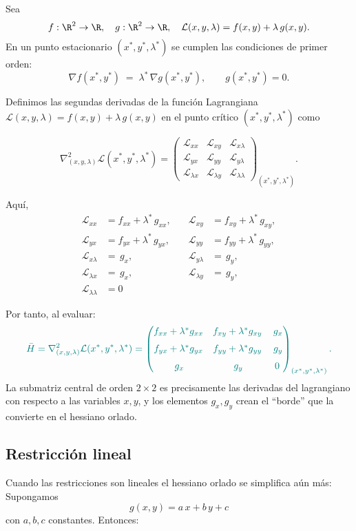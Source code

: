 \documentclass{article}
\begin{document}
Sea
\[
f:\R^2\to\R,
\quad
g:\R^2\to\R,
\quad
\mathcal L(x,y,\lambda)=f(x,y)+\lambda\,g(x,y).
\]
En un punto estacionario $(x^*,y^*,\lambda^*)$ se cumplen las condiciones de primer orden:
\[
\nabla f(x^*,y^*) \;=\;\lambda^*\,\nabla g(x^*,y^*),
\qquad
g(x^*,y^*)=0.
\]


Definimos las segundas derivadas de la función Lagrangiana
\(\mathcal L(x,y,\lambda)=f(x,y)+\lambda\,g(x,y)\) en el punto crítico \((x^*,y^*,\lambda^*)\) como

\[
\nabla^2_{(x,y,\lambda)}\mathcal L(x^*,y^*,\lambda^*)
=
\begin{pmatrix}
\mathcal L_{xx} & \mathcal L_{xy} & \mathcal L_{x\lambda} \\[6pt]
\mathcal L_{yx} & \mathcal L_{yy} & \mathcal L_{y\lambda} \\[6pt]
\mathcal L_{\lambda x} & \mathcal L_{\lambda y} & \mathcal L_{\lambda\lambda}
\end{pmatrix}_{(x^*,y^*,\lambda^*)}.
\]

Aquí,
\[
\begin{aligned}
\mathcal L_{xx}&=f_{xx}+\lambda^*\,g_{xx}, 
&\quad
\mathcal L_{xy}&=f_{xy}+\lambda^*\,g_{xy},\\
\mathcal L_{yx}&=f_{yx}+\lambda^*\,g_{yx}, 
&\quad
\mathcal L_{yy}&=f_{yy}+\lambda^*\,g_{yy},\\[4pt]
\mathcal L_{x\lambda}&=\,g_x,
&\quad
\mathcal L_{y\lambda}&=\,g_y,\\
\mathcal L_{\lambda x}&=\,g_x,
&\quad
\mathcal L_{\lambda y}&=\,g_y,\\[4pt]
\mathcal L_{\lambda\lambda}&=0
\end{aligned}
\]

Por tanto, al evaluar:
\[\color{teal}
\bar{H}=\nabla^2_{(x,y,\lambda)}\mathcal L(x^*,y^*,\lambda^*)
=
\begin{pmatrix}
f_{xx}+\lambda^*g_{xx} & f_{xy}+\lambda^*g_{xy} & \,g_x \\[6pt]
f_{yx}+\lambda^*g_{yx} & f_{yy}+\lambda^*g_{yy} & \,g_y \\[6pt]
\,g_x & \,g_y & 0
\end{pmatrix}_{(x^*,y^*,\lambda^*)}.
\]
La submatriz central de orden \(2\times2\) es precisamente las derivadas del lagrangiano con respecto a las variables $x,y$, y los elementos
\(g_x,g_y\) crean el “borde” que la convierte en el hessiano orlado.


\subsection*{Restricción lineal}
Cuando las restricciones son lineales el hessiano orlado se simplifica aún más: Supongamos 
\[
g(x,y)=a\,x + b\,y + c
\]
con \(a,b,c\) constantes. Entonces:
\end{document}
